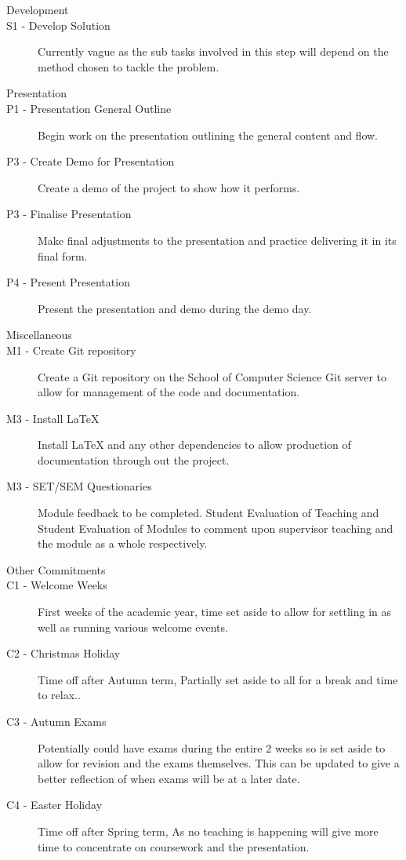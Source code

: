 \documentclass[a4paper]{article}
\begin{document}
\begin{description}
\item [\large{Development}]
\item [S1 - Develop Solution]
Currently vague as the sub tasks involved in this step will depend on the method chosen to tackle the problem.

\item [\large{Presentation}]
\item [P1 - Presentation General Outline]
Begin work on the presentation outlining the general content and flow.
\item [P3 - Create Demo for Presentation]
Create a demo of the project to show how it performs.
\item [P3 - Finalise Presentation]
Make final adjustments to the presentation and practice delivering it in its final form.
\item [P4 - Present Presentation]
Present the presentation and demo during the demo day.

\item [\large{Miscellaneous}]
\item [M1 - Create Git repository]
Create a Git repository on the School of Computer Science Git server to allow for management of the code and documentation.
\item [M3 - Install LaTeX]
Install LaTeX and any other dependencies to allow production of documentation through out the project.
\item [M3 - SET/SEM Questionaries]
Module feedback to be completed. Student Evaluation of Teaching and Student Evaluation of Modules to comment upon supervisor teaching and the module as a whole respectively.

\item [\large{Other Commitments}]
\item [C1 - Welcome Weeks]
First weeks of the academic year, time set aside to allow for settling in as well as running various welcome events.
\item [C2 - Christmas Holiday]
Time off after Autumn term, Partially set aside to all for a break and time to relax..
\item [C3 - Autumn Exams]
Potentially could have exams during the entire 2 weeks so is set aside to allow for revision and the exams themselves.
This can be updated to give a better reflection of when exams will be at a later date.
\item [C4 - Easter Holiday]
Time off after Spring term, As no teaching is happening will give more time to concentrate on coursework and the presentation.
\end{description}
\end{document}
